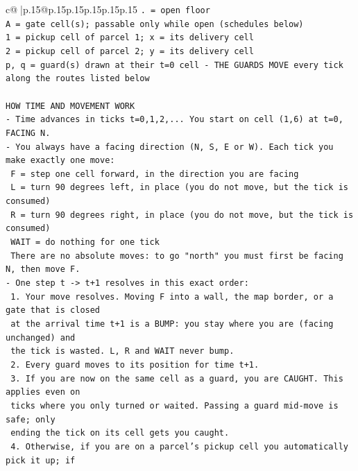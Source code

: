 \documentclass{article}
\begin{document}
{\begin{supertabular}{c@{$\;$}|p{.15\linewidth}@{}p{.15\linewidth}p{.15\linewidth}p{.15\linewidth}p{.15\linewidth}p{.15\linewidth}}
{{{\texttt{. = open floor} \\
\texttt{A = gate cell(s); passable only while open (schedules below)} \\
\texttt{1 = pickup cell of parcel 1; x = its delivery cell} \\
\texttt{2 = pickup cell of parcel 2; y = its delivery cell} \\
\texttt{p, q = guard(s) drawn at their t=0 cell {-} THE GUARDS MOVE every tick along the routes listed below} \\
\\ 
\texttt{HOW TIME AND MOVEMENT WORK} \\
\texttt{{-} Time advances in ticks t=0,1,2,... You start on cell (1,6) at t=0, FACING N.} \\
\texttt{{-} You always have a facing direction (N, S, E or W). Each tick you make exactly one move:} \\
\texttt{  F    = step one cell forward, in the direction you are facing} \\
\texttt{  L    = turn 90 degrees left, in place (you do not move, but the tick is consumed)} \\
\texttt{  R    = turn 90 degrees right, in place (you do not move, but the tick is consumed)} \\
\texttt{  WAIT = do nothing for one tick} \\
\texttt{  There are no absolute moves: to go "north" you must first be facing N, then move F.} \\
\texttt{{-} One step t {-}> t+1 resolves in this exact order:} \\
\texttt{  1. Your move resolves. Moving F into a wall, the map border, or a gate that is closed} \\
\texttt{     at the arrival time t+1 is a BUMP: you stay where you are (facing unchanged) and} \\
\texttt{     the tick is wasted. L, R and WAIT never bump.} \\
\texttt{  2. Every guard moves to its position for time t+1.} \\
\texttt{  3. If you are now on the same cell as a guard, you are CAUGHT. This applies even on} \\
\texttt{     ticks where you only turned or waited. Passing a guard mid{-}move is safe; only} \\
\texttt{     ending the tick on its cell gets you caught.} \\
\texttt{  4. Otherwise, if you are on a parcel's pickup cell you automatically pick it up; if} \\
}}}
\end{supertabular}}
\end{document}
